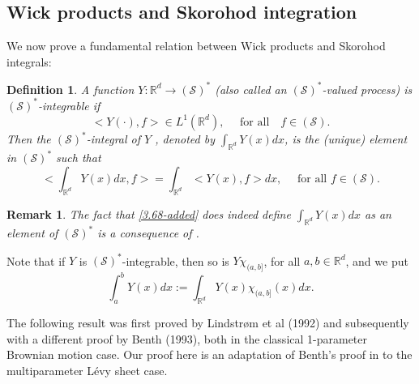 \documentclass[12pt]{article}%
\newtheorem{definition}[theorem]{Definition}
\newtheorem{remark}[theorem]{Remark}
\numberwithin{equation}{section}
\begin{document}
\subsection{Wick products and Skorohod integration}

We now prove a fundamental relation between Wick products and
Skorohod integrals:

\begin{definition}
\label{definition3.13-added} A function $Y:\mathbb{R}^d \to 
(\mathcal{S})^{*}$ (also called an $(\mathcal{S})^{*}$-valued process) is
\emph{$(\mathcal{S})^{*}$-integrable} if
\[
< Y(\cdot),f> \in L^{1}(\mathbb{R}^d), \quad\text{ for all}\quad f\in(\mathcal{S}).
\]
Then the \emph{$(\mathcal{S})^{*}$-integral of $Y$}%
%
, denoted by $\int_{\mathbb{R}^d} Y(x)dx$, is the (unique) element in
$(\mathcal{S})^{*}$ such that
\begin{equation}
\label{3.68-added}<\int_{\mathbb{R}^d}Y(x)dx, f> = \int_{\mathbb{R}^d} <Y(x),f>
dx, \quad\text{ for all } f\in(\mathcal{S}).
\end{equation}

\end{definition}

\begin{remark}
\label{remark3.14-added} The fact that \eqref{3.68-added} does indeed define
$\int_{\mathbb{R}^d }Y(x)dx$ as an element of $(\mathcal{S})^{*}$ is a
consequence of \cite[Proposition 8.1]{HKPS}.
\end{remark}

Note that if $Y$ is $(\mathcal{S})^{*}$-integrable, then so is $Y\chi_{(a,b]}%
$, for all $a,b\in\mathbb{R}^d$, and we put
\[
\int_{a}^{b} Y(x)dx := \int_{\mathbb{R}^d}Y(x)\chi_{(a,b]}(x)dx.
\]

The following result was first proved by Lindstr\o m et al \cite{LOU} (1992) and subsequently with a different proof by Benth \cite{B} (1993), both in the classical 1-parameter Brownian motion case. Our proof here is an adaptation of Benth's proof in \cite{B} to the multiparameter L\' evy sheet case.
\end{document}

